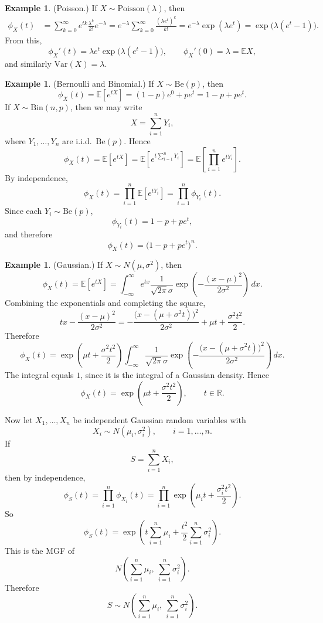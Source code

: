 \documentclass[11pt]{article}
\theoremstyle{plain}
\theoremstyle{definition}
\newtheorem{example}[theorem]{Example}
\theoremstyle{remark}
\begin{document}
	
	\begin{example}
		(Poisson.)
		If \(X\sim \mathrm{Poisson}(\lambda)\), then
		\begin{align*}
			\phi_X(t)
			&=\sum_{k=0}^{\infty} e^{tk}\frac{\lambda^k}{k!}e^{-\lambda}
			=e^{-\lambda}\sum_{k=0}^{\infty}\frac{(\lambda e^{t})^k}{k!}
			=e^{-\lambda}\exp(\lambda e^{t})
			=\exp\!\big(\lambda(e^{t}-1)\big).
		\end{align*}
		From this,
		\[
		\phi_X'(t)=\lambda e^t\exp\!\big(\lambda(e^t-1)\big),
		\qquad
		\phi_X'(0)=\lambda=\mathbb{E}X,
		\]
		and similarly \(\mathrm{Var}(X)=\lambda\).
	\end{example}
	
\begin{example}
	(Bernoulli and Binomial.)
	If \(X\sim \mathrm{Be}(p)\), then
	\[
	\phi_X(t)=\mathbb{E}[e^{tX}]=(1-p)e^{0}+pe^{t}=1-p+pe^{t}.
	\]
	If \(X\sim \mathrm{Bin}(n,p)\), then we may write
	\[
	X=\sum_{i=1}^n Y_i,
	\]
	where \(Y_1,\dots,Y_n\) are i.i.d.\ \(\mathrm{Be}(p)\). Hence
	\[
	\phi_X(t)
	=\mathbb{E}[e^{tX}]
	=\mathbb{E}\!\left[e^{t\sum_{i=1}^n Y_i}\right]
	=\mathbb{E}\!\left[\prod_{i=1}^n e^{tY_i}\right].
	\]
	By independence,
	\[
	\phi_X(t)
	=\prod_{i=1}^n \mathbb{E}[e^{tY_i}]
	=\prod_{i=1}^n \phi_{Y_i}(t).
	\]
	Since each \(Y_i\sim \mathrm{Be}(p)\),
	\[
	\phi_{Y_i}(t)=1-p+pe^t,
	\]
	and therefore
	\[
	\phi_X(t)=\bigl(1-p+pe^t\bigr)^n.
	\]
\end{example}
	

\begin{example}
	(Gaussian.)
	If \(X\sim N(\mu,\sigma^2)\), then
	\[
	\phi_X(t)=\mathbb{E}[e^{tX}]
	=\int_{-\infty}^{\infty} e^{tx}\frac{1}{\sqrt{2\pi}\sigma}
	\exp\!\left(-\frac{(x-\mu)^2}{2\sigma^2}\right)\,dx.
	\]
	Combining the exponentials and completing the square,
	\[
	tx-\frac{(x-\mu)^2}{2\sigma^2}
	=
	-\frac{\bigl(x-(\mu+\sigma^2 t)\bigr)^2}{2\sigma^2}
	+\mu t+\frac{\sigma^2 t^2}{2}.
	\]
	Therefore
	\[
	\phi_X(t)
	=
	\exp\!\left(\mu t+\frac{\sigma^2 t^2}{2}\right)
	\int_{-\infty}^{\infty}
	\frac{1}{\sqrt{2\pi}\sigma}
	\exp\!\left(
	-\frac{\bigl(x-(\mu+\sigma^2 t)\bigr)^2}{2\sigma^2}
	\right)\,dx.
	\]
	The integral equals \(1\), since it is the integral of a Gaussian density. Hence
	\[
	\phi_X(t)=\exp\!\left(\mu t+\frac{\sigma^2 t^2}{2}\right),
	\qquad t\in\mathbb{R}.
	\]
	
	Now let \(X_1,\dots,X_n\) be independent Gaussian random variables with
	\[
	X_i\sim N(\mu_i,\sigma_i^2),
	\qquad i=1,\dots,n.
	\]
	If
	\[
	S=\sum_{i=1}^n X_i,
	\]
	then by independence,
	\[
	\phi_S(t)
	=
	\prod_{i=1}^n \phi_{X_i}(t)
	=
	\prod_{i=1}^n
	\exp\!\left(\mu_i t+\frac{\sigma_i^2 t^2}{2}\right).
	\]
	So
	\[
	\phi_S(t)
	=
	\exp\!\left(
	t\sum_{i=1}^n \mu_i
	+\frac{t^2}{2}\sum_{i=1}^n \sigma_i^2
	\right).
	\]
	This is the MGF of
	\[
	N\!\left(\sum_{i=1}^n \mu_i,\ \sum_{i=1}^n \sigma_i^2\right).
	\]
	Therefore
	\[
	S\sim N\!\left(\sum_{i=1}^n \mu_i,\ \sum_{i=1}^n \sigma_i^2\right).
	\]
\end{example}
\end{document}
